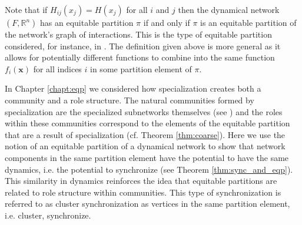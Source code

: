 \documentclass[12pt]{thesis}
\begin{document}
Note that if $H_{ij}(x_j)=H(x_j)$ for all $i$ and $j$ then the dynamical network $(F,\mathbb{R}^n)$ has an equitable partition $\pi$ if and only if $\pi$ is an equitable partition of the network's graph of interactions.
This is the type of equitable partition considered, for instance, in \cite{11}.
The definition given above is more general as it allows for potentially different functions to combine into the same function $f_i(\mathbf{x})$ for all indices $i$ in some partition element of $\pi$.


In Chapter \ref{chapt:eqp} we considered how specialization creates both a community and a role structure.
The natural communities formed by specialization are the specialized subnetworks themselves (see \cite{8}) and the roles within these communities correspond to the elements of the equitable partition that are a result of specialization (cf. Theorem \ref{thm:coarse}).
Here we use the notion of an equitable partition of a dynamical network to show that network components in the same partition element have the potential to have the same dynamics, i.e. the potential to {synchronize} (see Theorem \ref{thm:sync_and_eqp}).
This similarity in dynamics reinforces the idea that equitable partitions are related to role structure within communities.
This type of synchronization is referred to as {cluster synchronization} as vertices in the same partition element, i.e. {cluster}, synchronize.

\end{document}
